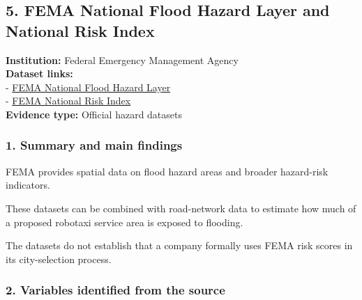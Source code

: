 \documentclass[10pt,a4paper]{article}
\begin{document}
\hypertarget{fema-national-flood-hazard-layer-and-national-risk-index}{%
\subsection{5. FEMA National Flood Hazard Layer and National Risk Index}\label{fema-national-flood-hazard-layer-and-national-risk-index}}

\textbf{Institution:} Federal Emergency Management Agency\\
\textbf{Dataset links:}\\
- \href{https://www.fema.gov/flood-maps/national-flood-hazard-layer}{FEMA National Flood Hazard Layer}\\
- \href{https://hazards.fema.gov/nri/}{FEMA National Risk Index}\\
\textbf{Evidence type:} Official hazard datasets

\hypertarget{summary-and-main-findings-8}{%
\subsubsection{1. Summary and main findings}\label{summary-and-main-findings-8}}

FEMA provides spatial data on flood hazard areas and broader hazard-risk indicators.

These datasets can be combined with road-network data to estimate how much of a proposed robotaxi service area is exposed to flooding.

The datasets do not establish that a company formally uses FEMA risk scores in its city-selection process.

\hypertarget{variables-identified-from-the-source-8}{%
\subsubsection{2. Variables identified from the source}\label{variables-identified-from-the-source-8}}
\end{document}
